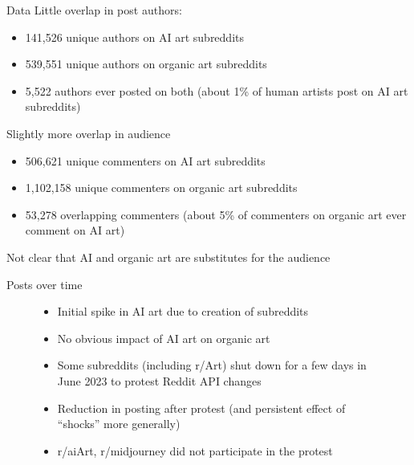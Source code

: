 \documentclass[aspectratio=169]{beamer}
\def\defaultscalefig{0.4}
\begin{document}
\begin{frame}{Data}
Little overlap in post authors:
	\begin{itemize}
		\item 141,526 unique authors on AI art subreddits
		\item 539,551 unique authors on organic art subreddits
		\item 5,522 authors ever posted on both
			(about 1\% of human artists post on AI art subreddits)
	\end{itemize}
Slightly more overlap in audience
	\begin{itemize}
		\item 506,621 unique commenters on AI art subreddits
		\item 1,102,158 unique commenters on organic art subreddits
		\item 53,278 overlapping commenters
			(about 5\% of commenters on organic art ever comment on AI art)
	\end{itemize}
Not clear that AI and organic art are substitutes for the audience
\end{frame}

\begin{frame}{Posts over time}
	\begin{figure}
		\begin{minipage}{0.45\textwidth}
			\centering
		\end{minipage}\hfill
		\begin{minipage}{0.45\textwidth}
			\centering
			\begin{itemize}
				\item Initial spike in AI art due to creation of subreddits
				\item No obvious impact of AI art on organic art
				\item Some subreddits (including r/Art) shut down for a few days in June 2023 to protest Reddit API changes
				\item Reduction in posting after protest
					(and persistent effect of ``shocks'' more generally)
				\item r/aiArt, r/midjourney did not participate in the protest
			\end{itemize}
		\end{minipage}
	\end{figure}
\end{frame}
\end{document}
